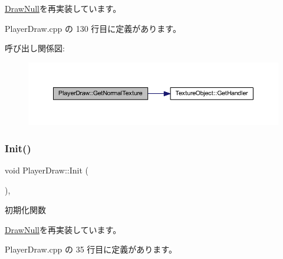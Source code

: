 \mbox{\hyperlink{class_draw_null_a41b7d148612b2d328e85289e32dc374c}{Draw\+Null}}を再実装しています。



 Player\+Draw.\+cpp の 130 行目に定義があります。

呼び出し関係図\+:\nopagebreak
\begin{figure}[H]
\begin{center}
\leavevmode
\includegraphics[width=350pt]{class_player_draw_abb93b530e38fc224ecbfe17d623f10fb_cgraph}
\end{center}
\end{figure}
\mbox{\label{class_player_draw_ad79a0fbeb618e0913822b573e5d0be68}} 
\subsubsection{\texorpdfstring{Init()}{Init()}}
{\footnotesize\ttfamily void Player\+Draw\+::\+Init (\begin{DoxyParamCaption}{ }\end{DoxyParamCaption})\hspace{0.3cm}{\ttfamily [override]}, {\ttfamily [virtual]}}



初期化関数 



\mbox{\hyperlink{class_draw_null_acd7fef3ccea1da537ac9507ffbb6dd2e}{Draw\+Null}}を再実装しています。



 Player\+Draw.\+cpp の 35 行目に定義があります。

